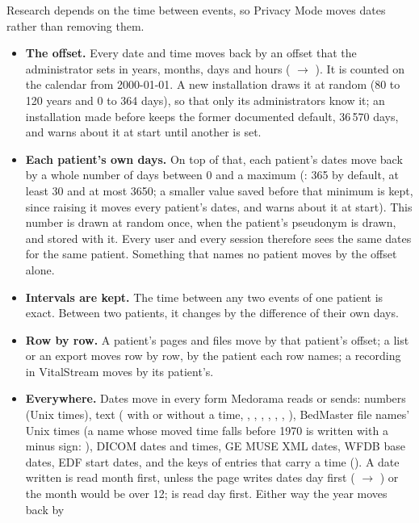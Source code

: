 Research depends on the time between events, so Privacy Mode moves dates rather than removing
them.
\begin{itemize}
\item \textbf{The offset.} Every date and time moves back by an offset that the
  administrator sets in years, months, days and hours ( $\rightarrow$ ). It is counted on the calendar from 2000-01-01. A new installation draws it at random
  (80 to 120 years and 0 to 364 days), so that only its administrators know it; an installation
  made before keeps the former documented default, 36\,570 days, and  warns
  about it at start until another is set.
\item \textbf{Each patient's own days.} On top of that, each patient's dates move back by a whole
  number of days between 0 and a maximum (: 365 by default, at least 30 and
  at most 3650; a smaller value saved before that minimum is kept, since raising it moves every
  patient's dates, and  warns about it at start). This number is drawn at
  random once, when the patient's
  pseudonym is drawn, and stored with it. Every user and every session therefore sees the same
  dates for the same patient. Something that names no patient moves by the offset alone.
\item \textbf{Intervals are kept.} The time between any two events of one patient is exact.
  Between two patients, it changes by the difference of their own days.
\item \textbf{Row by row.} A patient's pages and files move by that patient's offset; a list or an
  export moves row by row, by the patient each row names; a recording in VitalStream moves by its
  patient's.
\item \textbf{Everywhere.} Dates move in every form Medorama reads or sends: numbers (Unix
  times), text ( with or without a time, , ,
  , , , ,
  ), BedMaster file names' Unix times (a name whose moved time falls before 1970
  is written with a minus sign: ), DICOM dates and times, GE MUSE XML
  dates, WFDB base dates, EDF start dates, and the keys of entries that carry a time
  (). A date written  is read month first, unless
  the page writes dates day first ( $\rightarrow$ ) or the
  month would be over 12;  is read day first. Either way the year moves back by

\end{itemize}
